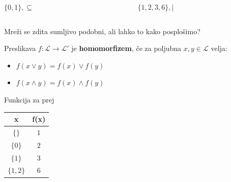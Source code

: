 \documentclass[slovene]{beamer}
\begin{document}
\begin{frame}
\begin{columns}
\begin{column}{5cm}
\begin{center}
$\{0,1\}, \subseteq$
\end{center}
\begin{figure}
\centering
{}
\end{figure}
\end{column}

\begin{column}{5cm}
\begin{center}
$\{1,2,3,6\}, |$
\end{center}
\begin{figure}
\centering
{}
\end{figure}
\end{column}
\end{columns}

\begin{block}{}
Mreži se zdita sumljivo podobni, ali lahko to kako posplošimo?
\end{block}

\end{frame}

\begin{frame}
\begin{definition}
Preslikava $f :\mathcal{L} \to \mathcal{L}'$ je \textbf{homomorfizem}, če za poljubna $x,y \in \mathcal{L}$ velja:
\begin{itemize}
\item $f(x \lor y) = f(x) \lor f(y)$
\item $f(x \land y) = f(x) \land f(y)$
\end{itemize}
\end{definition}



\begin{block}{Funkcija za prej}
\begin{table}[]
\centering
\label{my-label}
\begin{tabular}{c|c}
x         & f(x) \\ \hline
$\{\}$    & $1$  \\
$\{0\}$   & $2$  \\
$\{1\}$   & $3$  \\
$\{1,2\}$ & $6$ 
\end{tabular}
\end{table}
\end{block}

\end{frame}
\end{document}
